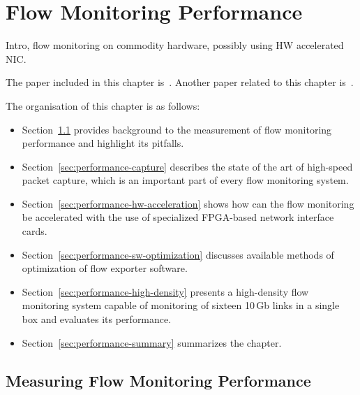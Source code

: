  \chapter{Flow Monitoring Performance}\label{chap:flow-monitoring-performance}

\begin{chapintro}

Intro, flow monitoring on commodity hardware, possibly using HW accelerated NIC.

The paper included in this chapter is~\cite{Velan-2015-High}. Another paper related to this chapter is~\cite{Pus-2015-Hardware}.

The organisation of this chapter is as follows:
\begin{itemize}
  \item Section~\ref{sec:performance-measurement} provides background to the measurement of flow monitoring performance and highlight its pitfalls.
  \item Section~\ref{sec:performance-capture} describes the state of the art of high-speed packet capture, which is an important part of every flow monitoring system.
  \item Section~\ref{sec:performance-hw-acceleration} shows how can the flow monitoring be accelerated with the use of specialized FPGA-based network interface cards.
  \item Section~\ref{sec:performance-sw-optimization} discusses available methods of optimization of flow exporter software.
  \item Section~\ref{sec:performance-high-density} presents a high-density flow monitoring system capable of monitoring of sixteen 10\,Gb links in a single box and evaluates its performance.
  \item Section~\ref{sec:performance-summary} summarizes the chapter.
\end{itemize}

\end{chapintro}

\newpage


\section{Measuring Flow Monitoring Performance}\label{sec:performance-measurement}

